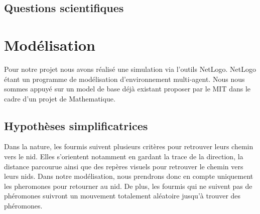 \documentclass{article}
\begin{document}
\subsection{Questions scientifiques}
\section{Modélisation}
Pour notre projet nous avons réalisé une simulation via l'outils NetLogo. NetLogo étant un programme de modélisation d'environnement multi-agent. Nous nous sommes appuyé sur un model de base déjà existant proposer par le MIT dans le cadre d'un projet de Mathematique.

\subsection{Hypothèses simplificatrices}
Dans la nature, les fourmis suivent plusieurs critères pour retrouver leurs chemin vers le nid. Elles s'orientent notamment en gardant la trace de la direction, la distance parcourue ainsi que des repères visuels pour retrouver le chemin vers leurs nids. Dans notre modélisation, nous prendrons donc en compte uniquement les pheromones pour retourner au nid. De plus, les fourmis qui ne suivent pas de phéromones suivront un mouvement totalement aléatoire jusqu'à trouver des phéromones.
\end{document}
